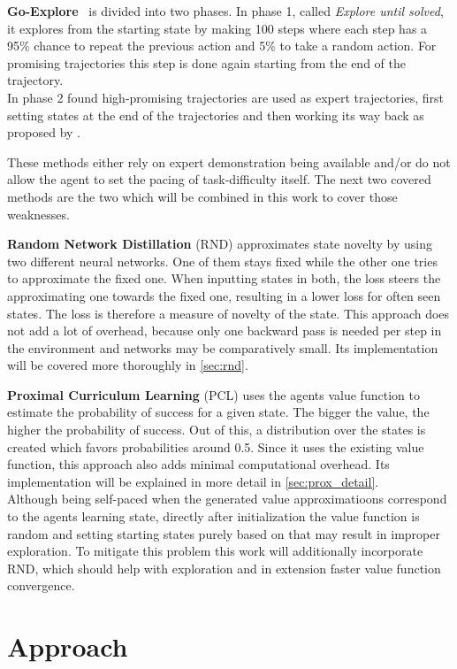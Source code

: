 \documentclass{article}
\begin{document}
\textbf{Go-Explore}~\citep{go_explore} is divided into two phases. In phase 1, called \textit{Explore until solved}, it explores from the starting state by making 100 steps where each step has a 95\% chance to repeat the previous action and 5\% to take a random action. For promising trajectories this step is done again starting from the end of the trajectory.\\
In phase 2 found high-promising trajectories are used as expert trajectories, first setting states at the end of the trajectories and then working its way back as proposed by \cite{montezuma_demonstration}.

These methods either rely on expert demonstration being available and/or do not allow the agent to set the pacing of task-difficulty itself. The next two covered methods are the two which will be combined in this work to cover those weaknesses.

\textbf{Random Network Distillation} (RND) approximates state novelty by using two different neural networks. One of them stays fixed while the other one tries to approximate the fixed one. When inputting states in both, the loss steers the approximating one towards the fixed one, resulting in a lower loss for often seen states. The loss is therefore a measure of novelty of the state. This approach does not add a lot of overhead, because only one backward pass is needed per step in the environment and networks may be comparatively small. Its implementation will be covered more thoroughly in \cref{sec:rnd}.

\textbf{Proximal Curriculum Learning} (PCL) uses the agents value function to estimate the probability of success for a given state. The bigger the value, the higher the probability of success. Out of this, a distribution over the states is created which favors probabilities around 0.5. Since it uses the existing value function, this approach also adds minimal computational overhead. Its implementation will be explained in more detail in \cref{sec:prox_detail}. \\
Although being self-paced when the generated value approximatioons correspond to the agents learning state, directly after initialization the value function is random and setting starting states purely based on that may result in improper exploration. To mitigate this problem this work will additionally incorporate RND, which should help with exploration and in extension faster value function convergence.


\section{Approach}
\label{sec:Approach}
\end{document}

